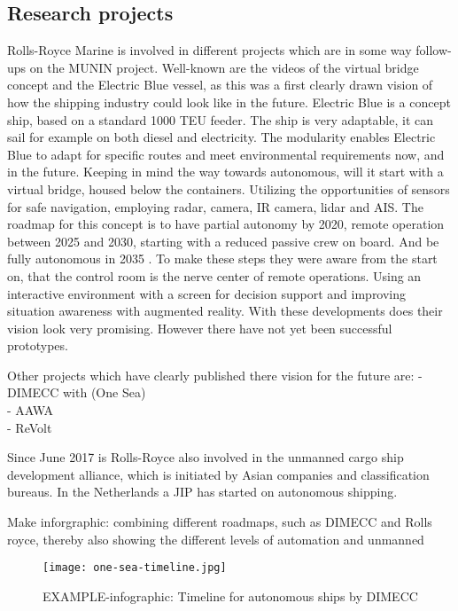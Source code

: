 \subsection{Research projects} 
Rolls-Royce Marine is involved in different projects which are in some way follow-ups on the MUNIN project. Well-known are the videos of the virtual bridge concept and the Electric Blue vessel, as this was a first clearly drawn vision of how the shipping industry could look like in the future. Electric Blue is a concept ship, based on a standard 1000 \ac{TEU} feeder. The ship is very adaptable, it can sail for example on both diesel and electricity. The modularity enables Electric Blue to adapt for specific routes and meet environmental requirements now, and in the future. 
Keeping in mind the way towards autonomous, will it start with a virtual bridge, housed below the containers. Utilizing the opportunities of sensors for safe navigation, employing radar, camera, IR camera, lidar and \ac{AIS}. The roadmap for this concept is to have partial autonomy by 2020, remote operation between 2025 and 2030, starting with a reduced passive crew on board. And be fully autonomous in 2035 \cite{Wilson2017}. 
To make these steps they were aware from the start on, that the control room is the nerve center of remote operations. Using an interactive environment with a screen for decision support and improving situation awareness with augmented reality. With these developments does their vision look very promising. However there have not yet been successful prototypes.

Other projects which have clearly published there vision for the future are:
- DIMECC with (One Sea)\\
- AAWA\\
- ReVolt\\

Since June 2017 is Rolls-Royce also involved in the unmanned cargo ship development alliance, which is initiated by Asian companies and classification bureaus.
In the Netherlands a \ac{JIP} has started on autonomous shipping.

Make inforgraphic: combining different roadmaps, such as DIMECC and Rolls royce, thereby also showing the different levels of automation and unmanned

\begin{figure}[b]
	\centering
	\texttt{[image: one-sea-timeline.jpg]}
	\caption{EXAMPLE-infographic: Timeline for autonomous ships by DIMECC}
	\label{fig:time-line-autonomous}
\end{figure}

